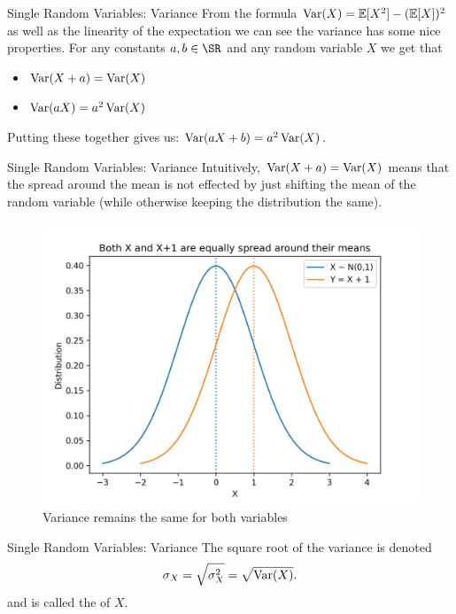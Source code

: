 \documentclass[notheorems,9pt]{beamer}
\begin{document}
\begin{frame}{Single Random Variables: Variance} 
	\label{frame:srv-var2}
	\onslide<+->
	From the formula \(\operatorname{Var}(X) = \mathbb{E}[X^2]-(\mathbb{E}[X])^2\) as well as the linearity of the expectation we can see the variance has some nice properties. For any constants \(a,b \in \SR\) and any random variable \(X\) we get that
	\begin{itemize}
		\item \(\operatorname{Var}(X+a) = \operatorname{Var}(X)\)
		\item \(\operatorname{Var}(aX) = a^2\operatorname{Var}(X)\)
	\end{itemize}
	\onslide<+->
	Putting these together gives us: \(\operatorname{Var}(aX+b)= a^2\operatorname{Var}(X)\).
	
\end{frame}
\begin{frame}{Single Random Variables: Variance} 
	\label{frame:srv-var3}
	Intuitively, \(\operatorname{Var}(X+a) = \operatorname{Var}(X)\) means that the spread around the mean is not effected by just shifting the mean of the random variable (while otherwise keeping the distribution the same).
	\begin{figure}[htpb]
		\centering
		\includegraphics[width=0.7\linewidth]{X-dist.png}
		\caption{Variance remains the same for both variables}%
		\label{fig:X-dist}
	\end{figure}
\end{frame}
\begin{frame}{Single Random Variables: Variance} 
	\label{frame:srv-var4}
	\onslide<+->
	The square root of the variance is denoted 
	\[
	    \sigma_X = \sqrt{\sigma^2_X} = \sqrt{\operatorname{Var}(X)}
	.\] 
	and is called the  of \(X\).
\end{frame}
\end{document}
